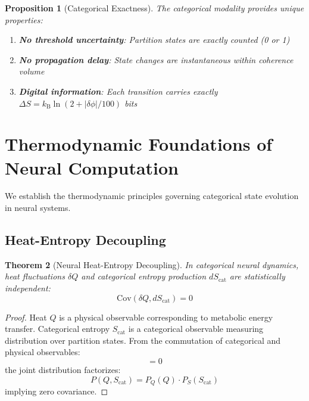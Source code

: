 \documentclass[aps,prd,twocolumn,superscriptaddress,floatfix,nofootinbib]{revtex4-2}
\newtheorem{theorem}{Theorem}[section]
\newtheorem{proposition}[theorem]{Proposition}
\theoremstyle{remark}
\newcommand{\kB}{k_{\mathrm{B}}}
\newcommand{\Scatent}{S_{\mathrm{cat}}}
\begin{document}
\begin{proposition}[Categorical Exactness]
\label{prop:cat_exact}
The categorical modality provides unique properties:
\begin{enumerate}
\item \textbf{No threshold uncertainty}: Partition states are exactly counted (0 or 1)
\item \textbf{No propagation delay}: State changes are instantaneous within coherence volume
\item \textbf{Digital information}: Each transition carries exactly $\Delta S = \kB \ln(2 + |\delta\phi|/100)$ bits
\end{enumerate}
\end{proposition}

\section{Thermodynamic Foundations of Neural Computation}
\label{sec:thermodynamics}

We establish the thermodynamic principles governing categorical state evolution in neural systems.

\subsection{Heat-Entropy Decoupling}

\begin{theorem}[Neural Heat-Entropy Decoupling]
\label{thm:heat_entropy}
In categorical neural dynamics, heat fluctuations $\delta Q$ and categorical entropy production $d\Scatent$ are statistically independent:
\begin{equation}
\text{Cov}(\delta Q, d\Scatent) = 0
\end{equation}
\end{theorem}

\begin{proof}
Heat $Q$ is a physical observable corresponding to metabolic energy transfer. Categorical entropy $\Scatent$ is a categorical observable measuring distribution over partition states. From the commutation of categorical and physical observables:
\begin{equation}
[\hat{O}_{\text{cat}}, \hat{O}_{\text{phys}}] = 0
\end{equation}
the joint distribution factorizes:
\begin{equation}
P(Q, \Scatent) = P_Q(Q) \cdot P_S(\Scatent)
\end{equation}
implying zero covariance.
\end{proof}
\end{document}
